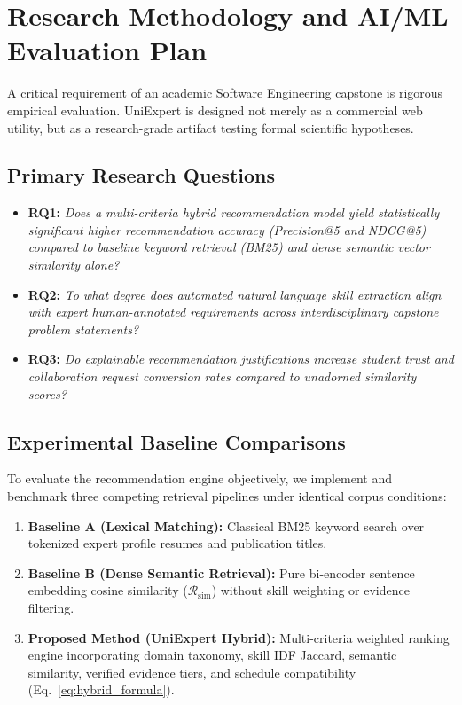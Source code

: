 \documentclass[11pt,a4paper]{article}
\begin{document}
\section[Research Methodology \& Evaluation]{Research Methodology and AI/ML Evaluation Plan}

A critical requirement of an academic Software Engineering capstone is rigorous empirical evaluation. UniExpert is designed not merely as a commercial web utility, but as a research-grade artifact testing formal scientific hypotheses.

\subsection{Primary Research Questions}
\begin{itemize}
    \item \textbf{RQ1:} \textit{Does a multi-criteria hybrid recommendation model yield statistically significant higher recommendation accuracy (Precision@5 and NDCG@5) compared to baseline keyword retrieval (BM25) and dense semantic vector similarity alone?}
    \item \textbf{RQ2:} \textit{To what degree does automated natural language skill extraction align with expert human-annotated requirements across interdisciplinary capstone problem statements?}
    \item \textbf{RQ3:} \textit{Do explainable recommendation justifications increase student trust and collaboration request conversion rates compared to unadorned similarity scores?}
\end{itemize}

\subsection{Experimental Baseline Comparisons}
To evaluate the recommendation engine objectively, we implement and benchmark three competing retrieval pipelines under identical corpus conditions:
\begin{enumerate}
    \item \textbf{Baseline A (Lexical Matching):} Classical BM25 keyword search over tokenized expert profile resumes and publication titles.
    \item \textbf{Baseline B (Dense Semantic Retrieval):} Pure bi-encoder sentence embedding cosine similarity ($\mathcal{R}_{\text{sim}}$) without skill weighting or evidence filtering.
    \item \textbf{Proposed Method (UniExpert Hybrid):} Multi-criteria weighted ranking engine incorporating domain taxonomy, skill IDF Jaccard, semantic similarity, verified evidence tiers, and schedule compatibility (Eq.~\ref{eq:hybrid_formula}).
\end{enumerate}
\end{document}
